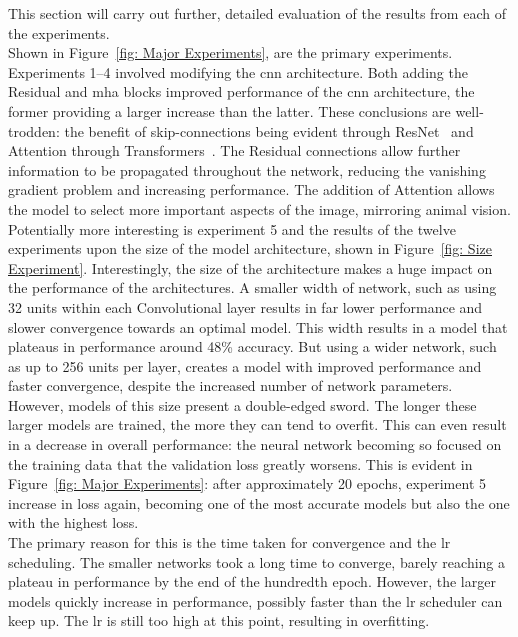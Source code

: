 \documentclass[11pt]{article}
\begin{document}
This section will carry out further, detailed evaluation of the results from each of the experiments.\\
Shown in Figure~\ref{fig: Major Experiments}, are the primary experiments. Experiments 1--4 involved modifying the \acrshort{cnn} architecture. Both adding the Residual and \acrshort{mha} blocks improved performance of the \acrshort{cnn} architecture, the former providing a larger increase than the latter. These conclusions are well-trodden: the benefit of skip-connections being evident through ResNet~\cite{OG_resnet, ResNet:_Solving_Vanishing_Gradient...} and Attention through Transformers~\cite{A_survey_of_visual_Transformers, OG_vit}. The Residual connections allow further information to be propagated throughout the network, reducing the vanishing gradient problem and increasing performance. The addition of Attention allows the model to select more important aspects of the image, mirroring animal vision.\\ 
Potentially more interesting is experiment 5 and the results of the twelve experiments upon the size of the model architecture, shown in Figure~\ref{fig: Size Experiment}. Interestingly, the size of the architecture makes a huge impact on the performance of the architectures. A smaller width of network, such as using 32 units within each Convolutional layer results in far lower performance and slower convergence towards an optimal model. This width results in a model that plateaus in performance around 48\% accuracy. But using a wider network, such as up to 256 units per layer, creates a model with improved performance and faster convergence, despite the increased number of network parameters. However, models of this size present a double-edged sword. The longer these larger models are trained, the more they can tend to overfit. This can even result in a decrease in overall performance: the neural network becoming so focused on the training data that the validation loss greatly worsens. This is evident in Figure~\ref{fig: Major Experiments}: after approximately 20 epochs, experiment 5 increase in loss again, becoming one of the most accurate models but also the one with the highest loss.\\
The primary reason for this is the time taken for convergence and the \acrshort{lr} scheduling. The smaller networks took a long time to converge, barely reaching a plateau in performance by the end of the hundredth epoch. However, the larger models quickly increase in performance, possibly faster than the \acrshort{lr} scheduler can keep up. The \acrshort{lr} is still too high at this point, resulting in overfitting.\\
\end{document}
